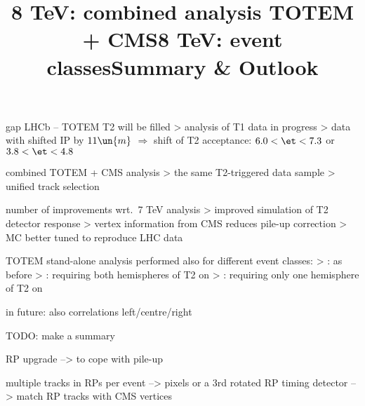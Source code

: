 
\> gap LHCb -- TOTEM T2 will be filled
\>> analysis of T1 data in progress
\>> data with shifted IP by $11\un{m}$ $\Rightarrow$ shift of T2 acceptance: $6.0 < \et < 7.3$ or  $3.8 < \et < 4.8$


\newpage %
\title{8 TeV: combined analysis TOTEM + CMS}

\vskip-3mm

\> combined TOTEM + CMS analysis
\>> the same T2-triggered data sample
\>> unified track selection

\> number of improvements wrt.~7 TeV analysis
\>> improved simulation of T2 detector response
\>> vertex information from CMS reduces pile-up correction
\>> MC better tuned to reproduce LHC data

\vfil
{}

\newpage %
\title{8 TeV: event classes}

\> TOTEM stand-alone analysis performed also for different event classes:
\>> : as before
\>> : requiring both hemispheres of T2 on
\>> : requiring only one hemisphere of T2 on

\vskip2mm

\vfil
\> in future: also correlations left/centre/right

\newpage %
\title{Summary \& Outlook}

\noindent {}

TODO: make a summary

\vfil
\noindent {}

RP upgrade --> to cope with pile-up

\> multiple tracks in RPs per event --> pixels or a 3rd rotated RP
\> timing detector --> match RP tracks with CMS vertices

\vfil
\eject
\bye
